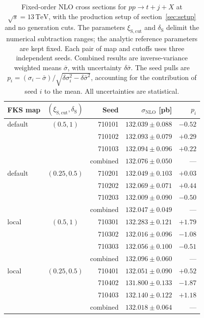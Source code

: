 \documentclass[a4paper,11pt]{article}
\newcommand{\TeV}{\ensuremath{\,\text{TeV}}}
\begin{document}
\begin{table}[t]
  \centering
  \begin{tabular}{@{}lcrrr@{}}
    \toprule
    FKS map & $(\xi_{\mathrm{S,cut}},\delta_{\mathrm S})$ & Seed & $\sigma_{\mathrm{NLO}}$ [pb] & $p_i$\\
    \midrule
    default & $(0.5,1)$ & 710101 & $132.039\pm0.088$ & $-0.52$\\
    & & 710102 & $132.093\pm0.079$ & $+0.29$\\
    & & 710103 & $132.094\pm0.096$ & $+0.22$\\
    & & combined & $132.076\pm0.050$ & ---\\
    \midrule
    default & $(0.25,0.5)$ & 710201 & $132.049\pm0.103$ & $+0.03$\\
    & & 710202 & $132.069\pm0.071$ & $+0.44$\\
    & & 710203 & $132.009\pm0.090$ & $-0.50$\\
    & & combined & $132.047\pm0.049$ & ---\\
    \midrule
    local & $(0.5,1)$ & 710301 & $132.283\pm0.121$ & $+1.79$\\
    & & 710302 & $132.016\pm0.096$ & $-1.08$\\
    & & 710303 & $132.056\pm0.100$ & $-0.51$\\
    & & combined & $132.096\pm0.060$ & ---\\
    \midrule
    local & $(0.25,0.5)$ & 710401 & $132.051\pm0.090$ & $+0.52$\\
    & & 710402 & $131.800\pm0.133$ & $-1.87$\\
    & & 710403 & $132.140\pm0.122$ & $+1.18$\\
    & & combined & $132.018\pm0.064$ & ---\\
    \bottomrule
  \end{tabular}
  \caption{Fixed-order NLO cross sections for $pp\to t+j+X$ at
    $\sqrt{s}=13\TeV$, with the production setup of
    section~\ref{sec:setup} and no generation cuts. The parameters
    $\xi_{\mathrm{S,cut}}$ and $\delta_{\mathrm S}$ delimit the numerical
    subtraction ranges; the analytic reference parameters are kept
    fixed. Each pair of map and cutoffs uses three independent seeds.
    Combined results are inverse-variance weighted means $\bar\sigma$,
    with uncertainty $\delta\bar\sigma$. The seed pulls are
    $p_i=(\sigma_i-\bar\sigma)/\sqrt{\delta\sigma_i^2-\delta\bar\sigma^2}$,
    accounting for the contribution of seed $i$ to the mean. All
    uncertainties are statistical.}
  \label{tab:fixedorder}
\end{table}
\end{document}
